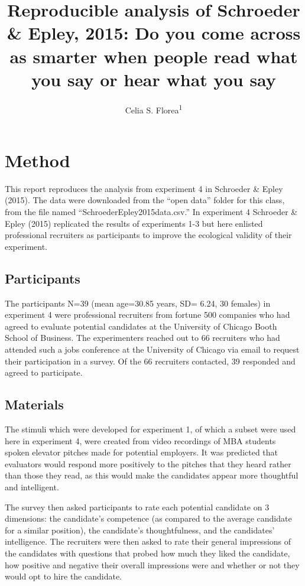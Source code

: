 \documentclass[
  english,
  man]{apa6}
\title{Reproducible analysis of Schroeder \& Epley, 2015: Do you come across as smarter when people read what you say or hear what you say}
\author{Celia S. Florea\textsuperscript{1}}
\date{}
\affiliation{\vspace{0.5cm}\textsuperscript{1} Brooklyn College of the City University of New York}
\begin{document}
\maketitle

\hypertarget{method}{%
\section{Method}\label{method}}

This report reproduces the analysis from experiment 4 in Schroeder \& Epley (2015). The data were downloaded from the ``open data'' folder for this class, from the file named ``SchroederEpley2015data.csv.'' In experiment 4 Schroeder \& Epley (2015) replicated the results of experiments 1-3 but here enlisted professional recruiters as participants to improve the ecological validity of their experiment.

\hypertarget{participants}{%
\subsection{Participants}\label{participants}}

The participants N=39 (mean age=30.85 years, SD= 6.24, 30 females) in experiment 4 were professional recruiters from fortune 500 companies who had agreed to evaluate potential candidates at the University of Chicago Booth School of Business. The experimenters reached out to 66 recruiters who had attended such a jobs conference at the University of Chicago via email to request their participation in a survey. Of the 66 recruiters contacted, 39 responded and agreed to participate.

\hypertarget{materials}{%
\subsection{Materials}\label{materials}}

The stimuli which were developed for experiment 1, of which a subset were used here in experiment 4, were created from video recordings of MBA students spoken elevator pitches made for potential employers. It was predicted that evaluators would respond more positively to the pitches that they heard rather than those they read, as this would make the candidates appear more thoughtful and intelligent.

The survey then asked participants to rate each potential candidate on 3 dimensions: the candidate's competence (as compared to the average candidate for a similar position), the candidate's thoughtfulness, and the candidates' intelligence. The recruiters were then asked to rate their general impressions of the candidates with questions that probed how much they liked the candidate, how positive and negative their overall impressions were and whether or not they would opt to hire the candidate.
\end{document}
